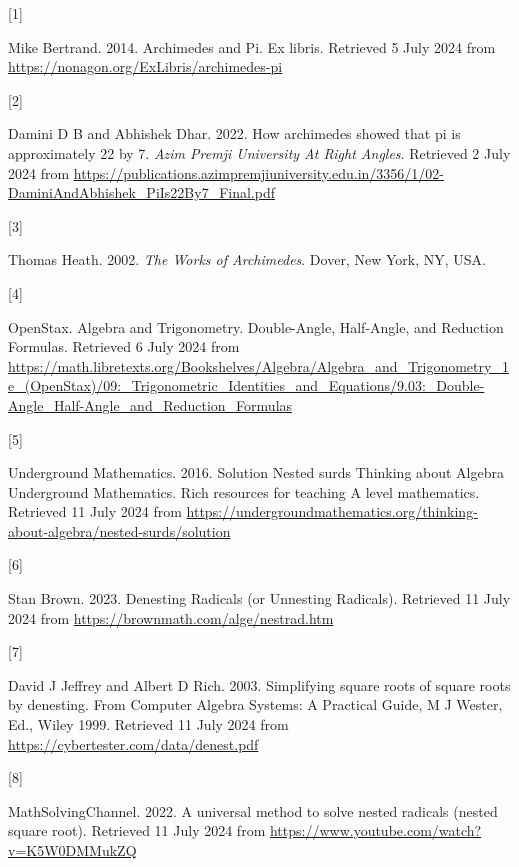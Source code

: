 \documentclass[
  a4paper,
]{article}
\newlength{\cslhangindent}
\newlength{\csllabelwidth}
\newenvironment{CSLReferences}[2] %
 {\begin{list}{}{%
  \setlength{\itemindent}{0pt}
  \setlength{\leftmargin}{0pt}
  \setlength{\parsep}{0pt}
  \ifodd #1
   \setlength{\leftmargin}{\cslhangindent}
   \setlength{\itemindent}{-1\cslhangindent}
  \fi
  \setlength{\itemsep}{#2\baselineskip}}}
 {\end{list}}
\newcommand{\CSLLeftMargin}[1]{\parbox[t]{\csllabelwidth}{\strut#1\strut}}
\newcommand{\CSLRightInline}[1]{\parbox[t]{\linewidth - \csllabelwidth}{\strut#1\strut}}
\begin{document}
\label{refs}
\begin{CSLReferences}{0}{0}
\CSLLeftMargin{{[}1{]} }%
\CSLRightInline{Mike Bertrand. 2014. {Archimedes and Pi}. Ex libris.
Retrieved 5 July 2024 from
\url{https://nonagon.org/ExLibris/archimedes-pi}}

\CSLLeftMargin{{[}2{]} }%
\CSLRightInline{Damini D B and Abhishek Dhar. 2022. How archimedes
showed that pi is approximately 22 by 7. \emph{{Azim Premji University
At Right Angles}}. Retrieved 2 July 2024 from
\url{https://publications.azimpremjiuniversity.edu.in/3356/1/02-DaminiAndAbhishek_PiIs22By7_Final.pdf}}

\CSLLeftMargin{{[}3{]} }%
\CSLRightInline{Thomas Heath. 2002. \emph{{The Works of Archimedes}}.
Dover, New York, NY, USA.}

\CSLLeftMargin{{[}4{]} }%
\CSLRightInline{OpenStax. {Algebra and Trigonometry}. {Double-Angle,
Half-Angle, and Reduction Formulas}. Retrieved 6 July 2024 from
\url{https://math.libretexts.org/Bookshelves/Algebra/Algebra_and_Trigonometry_1e_(OpenStax)/09:_Trigonometric_Identities_and_Equations/9.03:_Double-Angle_Half-Angle_and_Reduction_Formulas}}

\CSLLeftMargin{{[}5{]} }%
\CSLRightInline{Underground Mathematics. 2016. {Solution \textbar{}
Nested surds \textbar{} Thinking about Algebra \textbar{} Underground
Mathematics}. {Rich resources for teaching A level mathematics}.
Retrieved 11 July 2024 from
\url{https://undergroundmathematics.org/thinking-about-algebra/nested-surds/solution}}

\CSLLeftMargin{{[}6{]} }%
\CSLRightInline{Stan Brown. 2023. {Denesting Radicals (or Unnesting
Radicals)}. Retrieved 11 July 2024 from
\url{https://brownmath.com/alge/nestrad.htm}}

\CSLLeftMargin{{[}7{]} }%
\CSLRightInline{David J Jeffrey and Albert D Rich. 2003. Simplifying
square roots of square roots by denesting. {From Computer Algebra
Systems: A Practical Guide, M J Wester, Ed., Wiley 1999}. Retrieved 11
July 2024 from \url{https://cybertester.com/data/denest.pdf}}

\CSLLeftMargin{{[}8{]} }%
\CSLRightInline{MathSolvingChannel. 2022. A universal method to solve
nested radicals (nested square root). Retrieved 11 July 2024 from
\url{https://www.youtube.com/watch?v=K5W0DMMukZQ}}


\end{CSLReferences}
\end{document}
